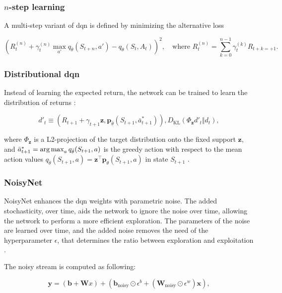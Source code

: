 \subsubsection{$n$-step learning}
A multi-step variant of \acrshort{dqn} is defined by minimizing the alternative loss \cite{n_step_learning}

\begin{equation}
\label{eq:n_step_learning}
(R_t^{(n)} + \gamma_t^{(n)} \max_{a'} q_{\bar\theta}(S_{t+n},a') - q_\theta(S_t, A_t))^2, \quad \text{where } R_t^{(n)} = \sum_{k=0}^{n-1} \gamma_t^{(k)} R_{t+k=+1}.
\end{equation}

\subsubsection{Distributional \acrshort{dqn}}
Instead of learning the expected return, the network can be trained to learn the distribution of returns \cite{distributional_dqn}:

\begin{equation}
\label{eq:distributional_dqn}
d'_t \equiv (R_{t+1} + \gamma_{t+1} \bm z, \bm p_{\bar\theta}(S_{t+1}, \bar{a}^*_{t+1})), D_{\text{KL}} (\Phi_{\bm z} d'_t \Vert d_t),
\end{equation}

\sloppy where $\Phi_{\bm z}$ is a L2-projection of the target distribution onto the fixed support $\bm z$, and ${ \bar{a}^*_{t+1} = \operatorname*{arg\,max}_a q_{\bar\theta}(S_{t+1}, a) }$ is the greedy action with respect to the mean action values ${ q_{\bar\theta}(S_{t+1}, a) = \bm z^\intercal \bm p_\theta(S_{t+1}, a) }$ in state $S_{t+1}$ \cite{rainbow}.

\subsubsection{NoisyNet}
NoisyNet enhances the \acrshort{dqn} weights with parametric noise. The added stochasticity, over time, aids the network to ignore the noise over time, allowing the network to perform a more efficient exploration. The parameters of the noise are learned over time, and the added noise removes the need of the hyperparameter $\epsilon$, that determines the ratio between exploration and exploitation \cite{noisy_net}.

The noisy stream is computed as following:

\begin{equation}
\label{eq:noisy_net}
\bm y = (\bm b + \bm Wx) + (\bm b_{\text{noisy}} \odot \epsilon^b + (\bm W_{\text{noisy}} \odot \epsilon^w) \bm x),
\end{equation}

